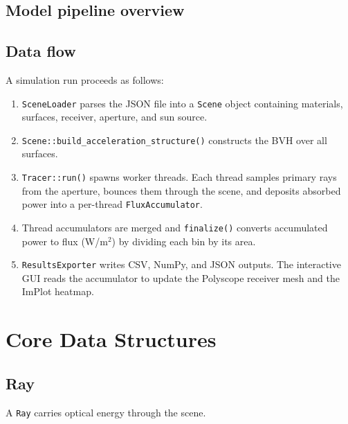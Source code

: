\documentclass[12pt,a4paper]{report}
\begin{document}
\section{Model pipeline overview}



\section{Data flow}

A simulation run proceeds as follows:

\begin{enumerate}
  \item \texttt{SceneLoader} parses the JSON file into a \texttt{Scene} object containing
        materials, surfaces, receiver, aperture, and sun source.
  \item \texttt{Scene::build\_acceleration\_structure()} constructs the BVH over all surfaces.
  \item \texttt{Tracer::run()} spawns worker threads.  Each thread samples primary rays from
        the aperture, bounces them through the scene, and deposits absorbed power into a
        per-thread \texttt{FluxAccumulator}.
  \item Thread accumulators are merged and \texttt{finalize()} converts accumulated power to
        flux (W/m$^2$) by dividing each bin by its area.
  \item \texttt{ResultsExporter} writes CSV, NumPy, and JSON outputs.  The interactive GUI
        reads the accumulator to update the Polyscope receiver mesh and the ImPlot heatmap.
\end{enumerate}

\chapter{Core Data Structures}

\section{Ray}

A \texttt{Ray} carries optical energy through the scene.
\end{document}
